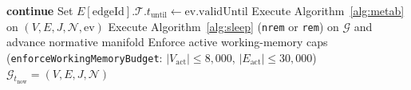 \begin{algorithm}[H]
\begin{algorithmic}[1]
     \textbf{continue} \EndIf
    \State Set $E[\mathrm{edgeId}].\mathcal{T}.t_{\mathrm{until}} \leftarrow \mathrm{ev}.\mathrm{validUntil}$
    \State Execute Algorithm~\ref{alg:metab} on $(V, E, J, \mathcal{N}, \mathrm{ev})$
    \State Execute Algorithm~\ref{alg:sleep} (\texttt{nrem} or \texttt{rem}) on $\mathcal{G}$ and advance normative manifold
  \EndIf
  \State Enforce active working-memory caps (\texttt{enforceWorkingMemoryBudget}: $|V_{\mathrm{act}}| \le 8{,}000$, $|E_{\mathrm{act}}| \le 30{,}000$)
\EndFor
\State \Return $\mathcal{G}_{t_{\mathrm{now}}} = (V, E, J, \mathcal{N})$
\end{algorithmic}
\end{algorithm}

